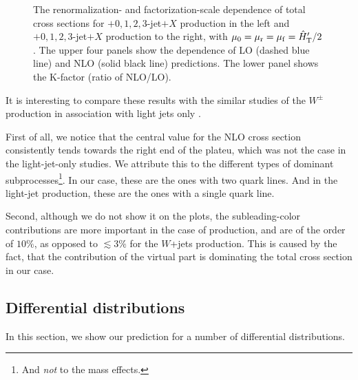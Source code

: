 \begin{figure}[t]
\begin{center}
\end{center}
\caption{The renormalization- and factorization-scale dependence of total cross
  sections for \Wbbm$+0,1,2,3$-jet$+X$ production in the left and
\Wbbp$+0,1,2,3$-jet$+X$ production to the right,
 with $\mu_0=\mu_\mathrm{r}=\mu_\mathrm{f}={\hat H}_{\mathrm T}'/2$. 
The upper four panels show the dependence of LO (dashed blue line) and
  NLO (solid black line) predictions. The lower panel shows
  the K-factor (ratio of NLO/LO).}
\label{fig_Wjets_sdep}
\end{figure}

It is interesting to compare these results with the similar studies of the $W^{\pm}$ production in association with light jets only \cite{BH:W3jPRL,BH:W4j,BH:W5j,Mangano:2016jyj,Anger:2017nkq}.

First of all, we notice that the central value for the NLO cross section consistently tends towards the right end of the plateu,
which was not the case in the light-jet-only studies. We attribute this
to the different types of dominant subprocesses\footnote{And \emph{not} to the mass effects.}.
In our case, these are the ones with two quark lines.
And in the light-jet production, these are the ones with a single quark line.

Second, although we do not show it on the plots,
the subleading-color contributions are more important in the case of \Wbbn{} production,
and are of the order of $10\%$, as opposed to  $\lesssim 3\%$ for the $W$+jets production.
This is caused by the fact, that the contribution of the virtual part
is dominating the total cross section in our case.

\subsection{Differential distributions}
\label{diffxsw}

In this section, we show our prediction for a number of differential distributions.

